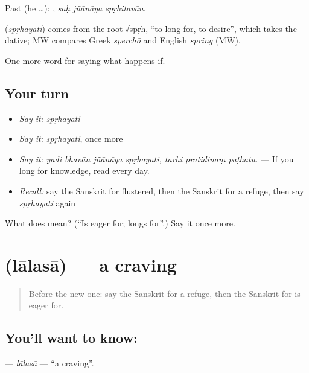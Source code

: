 Past (he …):   , \emph{saḥ jñānāya spṛhitavān}.

\begin{cousinweb}
\textbf{} (\emph{spṛhayati}) comes from the root √spṛh, \textquotedblleft{}to long for, to desire\textquotedblright{}, which takes the dative; MW compares Greek \emph{sperchō} and English \emph{spring} (MW).
\end{cousinweb}

\begin{grammarlens}[title={What you've built}]
One more word for saying what happens if.
\end{grammarlens}

\subsection*{Your turn}
\begin{itemize}
\raggedright
  \item \emph{Say it:} \emph{spṛhayati}
  \item \emph{Say it:} \emph{spṛhayati}, once more
  \item \emph{Say it:} \emph{yadi bhavān jñānāya spṛhayati, tarhi pratidinaṃ paṭhatu.} — If you long for knowledge, read every day.
  \item \emph{Recall:} say the Sanskrit for flustered, then the Sanskrit for a refuge, then say \emph{spṛhayati} again
\end{itemize}

\begin{tcolorbox}[breakable,colback=teal!4,colframe=teal!35!black,title={Before you move on}]
What does  mean? (\textquotedblleft{}Is eager for; longs for\textquotedblright{}.) Say it once more.
\end{tcolorbox}
\section[\texorpdfstring{\sk{लालसा} (lālasā)}{लालसा (lālasā)}]{ (lālasā) — a craving}

\label{lesson:SA-C549-lalasa}



\begin{quote}
Before the new one: say the Sanskrit for a refuge, then the Sanskrit for is eager for.
\end{quote}

\subsection*{You'll want to know: }
\textbf{} — \emph{lālasā} — \textquotedblleft{}a craving\textquotedblright{}.

